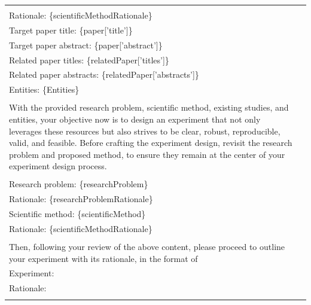 \begin{table}
{\begin{tabular}{ll}
{            \multicolumn{1}{p{.92\textwidth}}{{Scientific method: \{scientificMethod\}}} \\
            \multicolumn{1}{p{.92\textwidth}}{{Rationale: \{scientificMethodRationale\}}} \\
            \multicolumn{1}{p{.92\textwidth}}{{Target paper title: \{paper['title']\}}} \\
            \multicolumn{1}{p{.92\textwidth}}{{Target paper abstract: \{paper['abstract']\} }} \\
            \multicolumn{1}{p{.92\textwidth}}{{Related paper titles: \{relatedPaper['titles']\}}} \\
            \multicolumn{1}{p{.92\textwidth}}{{Related paper abstracts: \{relatedPaper['abstracts']\} }} \\
            \multicolumn{1}{p{.92\textwidth}}{{Entities: \{Entities\} }} \\ \\
            \multicolumn{1}{p{.92\textwidth}}{{With the provided research problem, scientific method, existing studies, and entities, your objective now is to design an experiment that not only leverages these resources but also strives to be clear, robust, reproducible, valid, and feasible. Before crafting the experiment design, revisit the research problem and proposed method, to ensure they remain at the center of your experiment design process.}} \\ \\
            \multicolumn{1}{p{.92\textwidth}}{{Research problem: \{researchProblem\}}} \\
            \multicolumn{1}{p{.92\textwidth}}{{Rationale: \{researchProblemRationale\}}} \\ 
            \multicolumn{1}{p{.92\textwidth}}{{Scientific method: \{scientificMethod\}}} \\
            \multicolumn{1}{p{.92\textwidth}}{{Rationale: \{scientificMethodRationale\}}} \\ \\
            \multicolumn{1}{p{.92\textwidth}}{{Then, following your review of the above content, please proceed to outline your experiment with its rationale, in the format of }} \\
            \multicolumn{1}{p{.92\textwidth}}{{Experiment: }} \\
            \multicolumn{1}{p{.92\textwidth}}{{Rationale: }} \\
        } \\
        \bottomrule
        \end{tabular}
    }
\end{table}